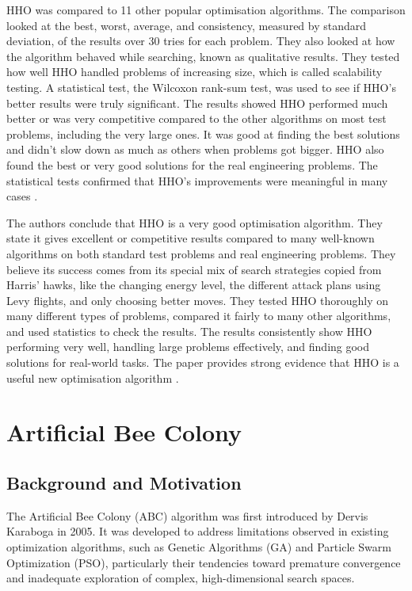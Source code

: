 \documentclass[a4paper, 12pt]{extarticle}
\begin{document}
HHO was compared to 11 other popular optimisation algorithms. The comparison looked at the best, worst, average, and consistency, measured by standard deviation, of the results over 30 tries for each problem. They also looked at how the algorithm behaved while searching, known as qualitative results. They tested how well HHO handled problems of increasing size, which is called scalability testing. A statistical test, the Wilcoxon rank-sum test, was used to see if HHO's better results were truly significant. The results showed HHO performed much better or was very competitive compared to the other algorithms on most test problems, including the very large ones. It was good at finding the best solutions and didn't slow down as much as others when problems got bigger. HHO also found the best or very good solutions for the real engineering problems. The statistical tests confirmed that HHO's improvements were meaningful in many cases \cite{heidari2019harris}.

The authors conclude that HHO is a very good optimisation algorithm. They state it gives excellent or competitive results compared to many well-known algorithms on both standard test problems and real engineering problems. They believe its success comes from its special mix of search strategies copied from Harris' hawks, like the changing energy level, the different attack plans using Levy flights, and only choosing better moves. They tested HHO thoroughly on many different types of problems, compared it fairly to many other algorithms, and used statistics to check the results. The results consistently show HHO performing very well, handling large problems effectively, and finding good solutions for real-world tasks. The paper provides strong evidence that HHO is a useful new optimisation algorithm \cite{heidari2019harris}.

\newpage
\section{Artificial Bee Colony}

\subsection{Background and Motivation}
The Artificial Bee Colony (ABC) algorithm was first introduced by Dervis Karaboga in 2005. It was developed to address limitations observed in existing optimization algorithms, such as Genetic Algorithms (GA) and Particle Swarm Optimization (PSO), particularly their tendencies toward premature convergence and inadequate exploration of complex, high-dimensional search spaces.\cite{karaboga2007powerful}
\end{document}
